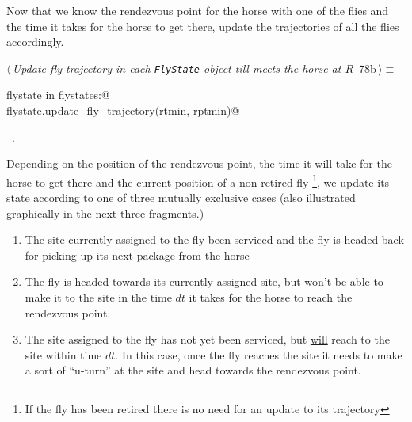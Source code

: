 \documentclass[11.5pt]{report}
\begin{document}
\vspace{-0.8cm} \newchunk
Now that we know the rendezvous point for the horse with one of the flies and the time it takes
for the horse to get there, update the trajectories of all the flies accordingly. 
\begin{flushleft} \small
\begin{minipage}{\linewidth}\label{scrap119}\raggedright\small
{} $\langle\,${\itshape Update fly trajectory in each \verb|FlyState| object till  meets the horse at $R$}\nobreak\ {\footnotesize {78b}}$\,\rangle\equiv$
\vspace{-1ex}
\begin{list}{}{} \item
\mbox{}\verb@for flystate in flystates:@\\
\mbox{}\verb@    flystate.update_fly_trajectory(rtmin, rptmin)@\\
\mbox{}\verb@@{\NWsep}
\end{list}
\vspace{-1.5ex}
\footnotesize
\begin{list}{}{\setlength{\itemsep}{-\parsep}\setlength{\itemindent}{-\leftmargin}}
\item \NWtxtMacroRefIn\ .

\item{}
\end{list}
\end{minipage}\vspace{4ex}
\end{flushleft}


\vspace{-0.8cm} \newchunk Depending on the position of the rendezvous point, the time it will take for the horse
to get there and the current position of a non-retired fly \footnote{If the fly has been retired there is no need 
for an update to its trajectory}, we update its state according to one of three mutually exclusive cases (also 
illustrated graphically in the next three fragments.)

\begin{enumerate}
 \item The site currently assigned to the fly been serviced and the fly is headed back for picking up 
       its next package from the horse
 \item The fly is headed towards its currently assigned site, but won't be able to make it to the site in 
       the time $dt$ it takes for the horse to reach the rendezvous point. 
 \item The site assigned to the fly has not yet been serviced, but \underline{will} reach
       to the site within time $dt$. In this case, once the fly reaches the site it needs to make 
       a sort of ``u-turn'' at the site and head towards the rendezvous point. 
\end{enumerate}
\end{document}
